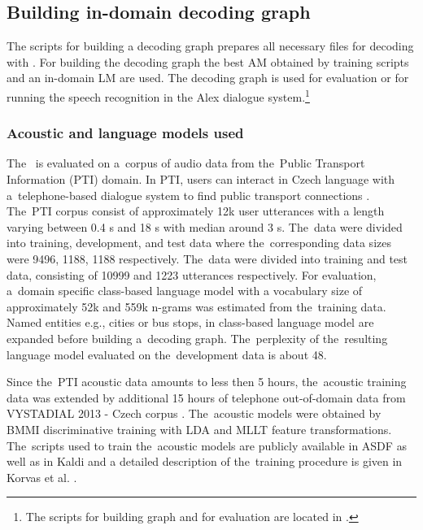 \subsection{Building in-domain decoding graph}
\label{sub:hclg}
The scripts for building a decoding graph prepares all necessary files for decoding with .
For building the decoding graph the best \ac{AM} obtained by training scripts  and an in-domain \ac{LM} are used.
The decoding graph is used for evaluation or for running the speech recognition in the Alex dialogue system.\footnote{The scripts for building  graph and for evaluation are located in .}

\subsubsection*{Acoustic and language models used}
\label{sec:ptilm}
The~ is evaluated on a~corpus of audio data from the~Public Transport Information (PTI) domain.
In PTI, users can interact in Czech language with a~telephone-based dialogue system to find public transport connections \cite{ptics2014url}.
The~PTI corpus consist of approximately 12k user utterances with a length varying between 0.4 s and 18 s with median around 3 s.
The~data were divided into training, development, and test data where the~corresponding data sizes were 9496, 1188, 1188 respectively.
The~data were divided into training and test data, consisting of 10999 and 1223 utterances respectively.
For evaluation, a~domain specific class-based language model with a vocabulary size of approximately 52k  and 559k n-grams was estimated from the~training data.
Named entities e.g., cities or bus stops, in class-based language model are expanded before building a~decoding graph.
The~perplexity of the~resulting language model evaluated on the~development data is about 48.

Since the~PTI acoustic data amounts to less then 5 hours, the~acoustic training data was extended by additional 15 hours of telephone out-of-domain data from VYSTADIAL 2013 - Czech corpus \cite{korvas_2014}.
The~acoustic models were obtained by BMMI discriminative training with LDA and MLLT feature transformations.
The~scripts used to train the~acoustic models are publicly available in ASDF \cite{asdf2014url} as well as in Kaldi \cite{kaldi2014url} and a detailed description of the~training procedure is given in Korvas et al. \cite{korvas_2014}.




